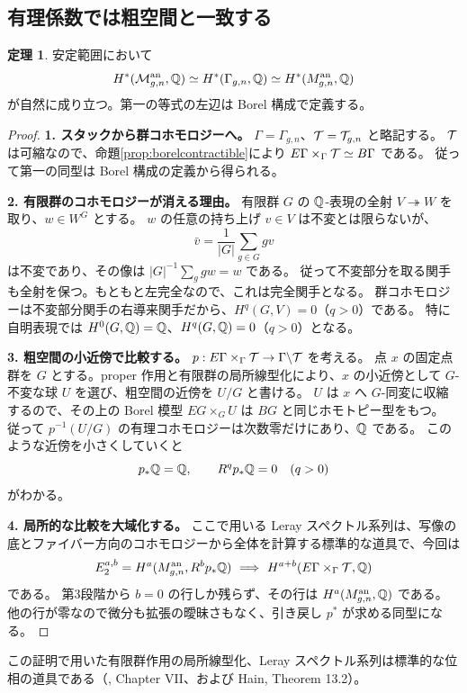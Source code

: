 \documentclass[dvipdfmx,a4paper,11pt]{article}
\theoremstyle{definition}
\newtheorem{thm}{定理}[section]
\begin{document}
\subsection{有理係数では粗空間と一致する}
\begin{thm}\label{thm:rationalcohom}
安定範囲において
\[
H^*(\mathcal M_{g,n}^{\rm an},\mathbb Q)\simeq H^*(\Gamma_{g,n},\mathbb Q)
\simeq H^*(M_{g,n}^{\rm an},\mathbb Q)
\]
が自然に成り立つ。第一の等式の左辺は Borel 構成で定義する。
\end{thm}
\begin{proof}
\textbf{1. スタックから群コホモロジーへ。}
$\Gamma=\Gamma_{g,n}$、$\mathcal T=\mathcal T_{g,n}$ と略記する。
$\mathcal T$ は可縮なので、命題\ref{prop:borelcontractible}により
$E\Gamma\times_\Gamma\mathcal T\simeq B\Gamma$ である。
従って第一の同型は Borel 構成の定義から得られる。

\textbf{2. 有限群のコホモロジーが消える理由。}
有限群 $G$ の $\mathbb Q$-表現の全射 $V\twoheadrightarrow W$ を取り、$w\in W^G$ とする。
$w$ の任意の持ち上げ $v\in V$ は不変とは限らないが、
\[
\bar v=\frac1{|G|}\sum_{g\in G}gv
\]
は不変であり、その像は $|G|^{-1}\sum_g gw=w$ である。
従って不変部分を取る関手も全射を保つ。もともと左完全なので、これは完全関手となる。
群コホモロジーは不変部分関手の右導来関手だから、$H^q(G,V)=0$（$q>0$）である。
特に自明表現では $H^0(G,\mathbb Q)=\mathbb Q$、$H^q(G,\mathbb Q)=0$（$q>0$）となる。

\textbf{3. 粗空間の小近傍で比較する。}
$p:E\Gamma\times_\Gamma\mathcal T\to\Gamma\backslash\mathcal T$ を考える。
点 $x$ の固定点群を $G$ とする。proper 作用と有限群の局所線型化により、$x$ の小近傍として $G$-不変な球 $U$ を選び、粗空間の近傍を $U/G$ と書ける。
$U$ は $x$ へ $G$-同変に収縮するので、その上の Borel 模型 $EG\times_GU$ は $BG$ と同じホモトピー型をもつ。
従って $p^{-1}(U/G)$ の有理コホモロジーは次数零だけにあり、$\mathbb Q$ である。
このような近傍を小さくしていくと
\[
p_*\mathbb Q=\mathbb Q,\qquad R^qp_*\mathbb Q=0\quad(q>0)
\]
がわかる。

\textbf{4. 局所的な比較を大域化する。}
ここで用いる Leray スペクトル系列は、写像の底とファイバー方向のコホモロジーから全体を計算する標準的な道具で、今回は
\[
E_2^{a,b}=H^a(M_{g,n}^{\rm an},R^bp_*\mathbb Q)
\ \Longrightarrow\ H^{a+b}(E\Gamma\times_\Gamma\mathcal T,\mathbb Q)
\]
である。
第3段階から $b=0$ の行しか残らず、その行は $H^a(M_{g,n}^{\rm an},\mathbb Q)$ である。
他の行が零なので微分も拡張の曖昧さもなく、引き戻し $p^*$ が求める同型になる。
\end{proof}
この証明で用いた有限群作用の局所線型化、Leray スペクトル系列は標準的な位相の道具である（\cite{Brown}, Chapter VII、および Hain, Theorem 13.2）。
\end{document}
